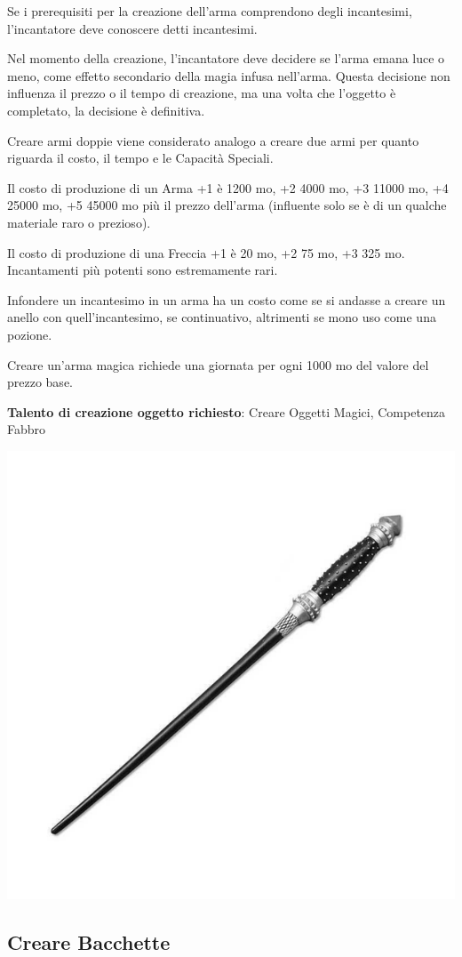 \begin{multicols}{2}
\medskip

Se i prerequisiti per la creazione dell'arma comprendono degli incantesimi, l'incantatore deve conoscere detti incantesimi.

Nel momento della creazione, l'incantatore deve decidere se l'arma emana luce o meno, come effetto secondario della magia infusa nell'arma. Questa decisione non influenza il prezzo o il tempo di creazione, ma una volta che l'oggetto è completato, la decisione è definitiva.

Creare armi doppie viene considerato analogo a creare due armi per quanto riguarda il costo, il tempo e le Capacità Speciali.

Il costo di produzione di un Arma +1 è 1200 mo, +2 4000 mo, +3 11000 mo, +4 25000 mo, +5 45000 mo più il prezzo dell'arma (influente solo se è di un qualche materiale raro o prezioso).

Il costo di produzione di una Freccia +1 è 20 mo, +2 75 mo, +3 325 mo. Incantamenti più potenti sono estremamente rari.

Infondere un incantesimo in un arma ha un costo come se si andasse a creare un anello con quell'incantesimo, se continuativo, altrimenti se mono uso come una pozione.

Creare un'arma magica richiede una giornata per ogni 1000 mo del valore del prezzo base.

\medskip

\textbf{Talento di creazione oggetto richiesto}: Creare Oggetti Magici, Competenza Fabbro

\begin{center}
	\includegraphics[width=0.5\linewidth]{immagini/wand.png}
\end{center}

\subsection{Creare Bacchette}\label{crearebacchette}


\end{multicols}
